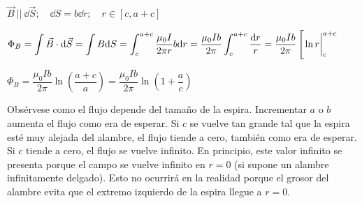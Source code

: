 $\vec B \ || \ \dd \vec S; \quad \dd S=b\dd r; \quad r\in[c,a+c]$

$\Phi_B=\displaystyle \int \vec B \cdot \dd \vec S = \int B \dd S =\int_c^{a+c} \dfrac {\mu_0 I}{2\pi r} b \dd r = \dfrac{\mu_0 Ib}{2 \pi} \int_c^{a+c} \dfrac{\dd r}{r}= \dfrac{\mu_0 Ib}{2 \pi} \left[ \eval{\ln r }_c^{a+c}  \right.$

$\Phi_B=\dfrac{\mu_0 Ib}{2 \pi} \ln \left( \dfrac{a+c}{a} \right) = \dfrac{\mu_0 Ib}{2 \pi} \ln \left( 1+\dfrac a c \right)$


Obsérvese como el flujo depende del tamaño de la espira. Incrementar $a$ o $b$ aumenta el flujo como era de  esperar. Si $c$ se vuelve tan grande tal que la espira esté muy alejada del alambre, el flujo tiende a cero, también como era de  esperar. \textcolor{gris}{Si $c$ tiende a cero, el flujo se vuelve infinito. En principio, este valor infinito se presenta porque el campo se vuelve infinito en $r = 0$ (si supone un alambre infinitamente delgado). Esto no ocurrirá en la realidad porque el grosor del alambre evita que el extremo izquierdo de la espira llegue a $r = 0$}.



